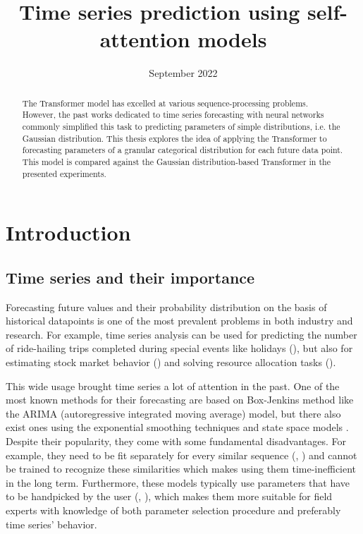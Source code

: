 \documentclass[en]{pracamgr}
\title{Time series prediction using self-attention models}
\date{September 2022}
\begin{document}
\maketitle

\begin{abstract}
The Transformer model has excelled at various sequence-processing problems. However, the past works dedicated to time series forecasting with neural networks commonly simplified this task to predicting parameters of simple distributions, i.e. the Gaussian distribution. This thesis explores the idea of applying the Transformer to forecasting parameters of a granular categorical distribution for each future data point. This model is compared against the Gaussian distribution-based Transformer in the presented experiments.
\end{abstract}

\tableofcontents

\chapter*{Introduction}
\section*{Time series and their importance}\label{r:tsi}

Forecasting future values and their probability distribution on the basis of historical datapoints is one of the most prevalent problems in both industry and research.
For example, time series analysis can be used for predicting the number of ride-hailing trips completed during special events like holidays (\cite{uber}), but also for estimating stock market behavior (\cite{stock1}) and solving resource allocation tasks (\cite{graph-forecast}). 

This wide usage brought time series a lot of attention in the past. One of the most known methods for their forecasting are based on Box-Jenkins method like the ARIMA (autoregressive integrated moving average) \cite{arima} model, but there also exist ones using the exponential smoothing techniques and state space models \cite{ssm}. Despite their popularity, they come with some fundamental disadvantages. For example, they need to be fit separately for every similar sequence (\cite{enhancing}, \cite{deepar}) and cannot be trained to recognize these similarities which makes using them time-inefficient in the long term.
Furthermore, these models typically use parameters that have to be handpicked by the user (\cite{enhancing},
\cite{deepar}), which makes them more suitable for field experts with knowledge of both parameter selection procedure and preferably time series' behavior.
\end{document}
